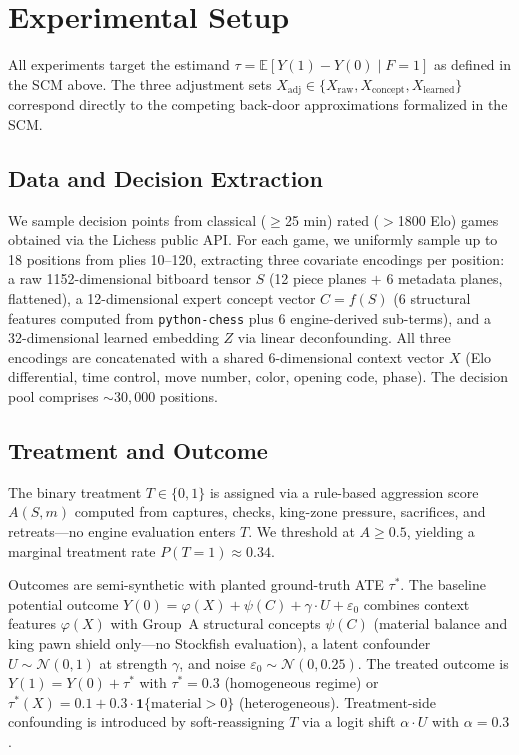 \documentclass[11pt]{article}
\begin{document}
\section*{Experimental Setup}

All experiments target the estimand $\tau = \mathbb{E}[Y(1) - Y(0) \mid F=1]$ as
defined in the SCM above. The three adjustment sets
$X_{\text{adj}} \in \{X_{\text{raw}}, X_{\text{concept}}, X_{\text{learned}}\}$
correspond directly to the competing back-door approximations formalized in the SCM.

\subsection*{Data and Decision Extraction}
We sample decision points from classical ($\geq$25 min) rated ($>$1800 Elo) games
obtained via the Lichess public API. For each game, we uniformly sample up to 18
positions from plies 10--120, extracting three covariate encodings per position: a
raw 1152-dimensional bitboard tensor $S$ (12 piece planes $+$ 6 metadata planes,
flattened), a 12-dimensional expert concept vector $C = f(S)$ (6 structural features
computed from \texttt{python-chess} plus 6 engine-derived sub-terms), and a
32-dimensional learned embedding $Z$ via linear deconfounding.\cite{kuang2020information}
All three encodings are concatenated with a shared 6-dimensional context vector $X$
(Elo differential, time control, move number, color, opening code, phase). The
decision pool comprises ${\sim}30{,}000$ positions.

\subsection*{Treatment and Outcome}
The binary treatment $T \in \{0,1\}$ is assigned via a rule-based aggression score
$A(S,m)$ computed from captures, checks, king-zone pressure, sacrifices, and
retreats---no engine evaluation enters $T$. We threshold at $A \geq 0.5$, yielding
a marginal treatment rate $P(T{=}1) \approx 0.34$.

Outcomes are semi-synthetic with planted ground-truth ATE $\tau^*$. The baseline
potential outcome $Y(0) = \varphi(X) + \psi(C) + \gamma \cdot U + \varepsilon_0$
combines context features $\varphi(X)$ with Group~A structural concepts $\psi(C)$
(material balance and king pawn shield only---no Stockfish evaluation), a latent
confounder $U \sim \mathcal{N}(0,1)$ at strength $\gamma$, and noise $\varepsilon_0
\sim \mathcal{N}(0, 0.25)$. The treated outcome is $Y(1) = Y(0) + \tau^*$ with
$\tau^* = 0.3$ (homogeneous regime) or $\tau^*(X) = 0.1 + 0.3 \cdot
\mathbf{1}\{\text{material} > 0\}$ (heterogeneous). Treatment-side confounding is
introduced by soft-reassigning $T$ via a logit shift $\alpha \cdot U$ with $\alpha
= 0.3$.
\end{document}
